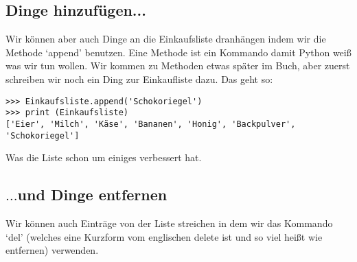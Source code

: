 \subsection*{\color{BrickRed}Dinge hinzufügen...}

Wir können aber auch Dinge an die Einkaufsliste dranhängen indem wir die Methode `append' benutzen. Eine Methode ist ein Kommando damit Python weiß was wir tun wollen. Wir kommen zu Methoden etwas später im Buch, aber zuerst schreiben wir noch ein Ding zur Einkaufliste dazu. Das geht so:

\begin{Verbatim}[frame=single]
>>> Einkaufsliste.append('Schokoriegel')
>>> print (Einkaufsliste)
['Eier', 'Milch', 'Käse', 'Bananen', 'Honig', 'Backpulver', 'Schokoriegel']
\end{Verbatim}

Was die Liste schon um einiges verbessert hat.

\subsection*{\color{BrickRed}$\ldots$und Dinge entfernen}


Wir können auch Einträge von der Liste streichen in dem wir das Kommando `del' (welches eine Kurzform vom englischen delete ist und so viel heißt wie entfernen) verwenden.

